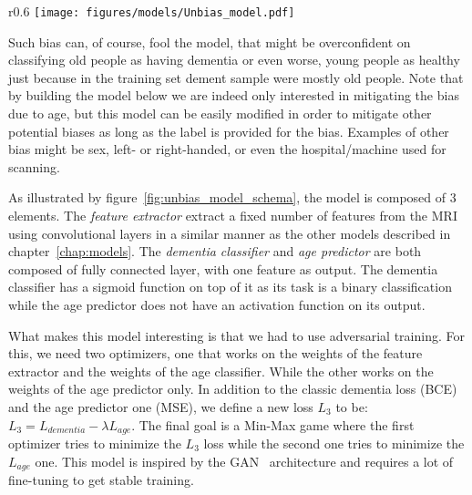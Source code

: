 \begin{wrapfigure}{r}{0.6\textwidth}
 \centering
 \texttt{[image: figures/models/Unbias\_model.pdf]}
 \captionsetup{width=.9\linewidth}
 \caption[UnbiasModelSchema]{Unbiased Model Schema.}
 \label{fig:unbias_model_schema}
\end{wrapfigure}

Such bias can, of course, fool the model, that might be overconfident on classifying old people as having dementia or even worse, young people as healthy just because in the training set dement sample were mostly old people.
Note that by building the model below we are indeed only interested in mitigating the bias due to age, but this model can be easily modified in order to mitigate other potential biases as long as the label is provided for the bias. Examples of other bias might be sex, left- or right-handed, or even the hospital/machine used for scanning.


As illustrated by figure~\ref{fig:unbias_model_schema}, the model is composed of 3 elements. The \textit{feature extractor} extract a fixed number of features from the MRI using convolutional layers in a similar manner as the other models described in chapter~\ref{chap:models}. The \textit{dementia classifier} and \textit{age predictor} are both composed of fully connected layer, with one feature as output. The dementia classifier has a sigmoid function on top of it as its task is a binary classification while the age predictor does not have an activation function on its output.

What makes this model interesting is that we had to use adversarial training. For this, we need two optimizers, one that works on the weights of the feature extractor and the weights of the age classifier. While the other works on the weights of the age predictor only. In addition to the classic dementia loss (BCE) and the age predictor one (MSE), we define a new loss $L_{3}$ to be: $L_3 = L_{dementia} - \lambda L_{age}$. The final goal is a Min-Max game where the first optimizer tries to minimize the $L_3$ loss while the second one tries to minimize the $L_{age}$ one. This model is inspired by the GAN~\cite{goodfellow2014generative} architecture and requires a lot of fine-tuning to get stable training.


